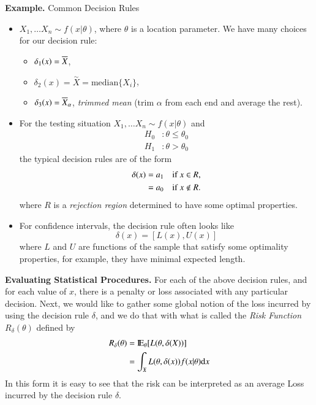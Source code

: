 \documentclass[captions=tableheading]{scrbook}
\begin{document}
\textbf{Example.} Common Decision Rules

\begin{itemize}
\item $X_{1},\ldots X_{n}\sim f(x|\theta)$, where $\theta$ is a location parameter. We have many choices for our decision rule:
\begin{itemize}
\item $\delta_{1}(x)=\overline{X}$,
\item $\delta_{2}(x)=\overset{\sim}{X}=\mathrm{median}\{X_{i}\}$,
\item $\delta_{3}(x)=\overline{X}_{\alpha}$, \emph{trimmed mean} (trim $\alpha$ from each end and average the rest).
\end{itemize}
\item For the testing situation \(X_{1},\ldots X_{n}\sim f(x|\theta)\) and
   \begin{align*}
   H_{0} & :\theta \leq \theta_{0}\\
   H_{1} & :\theta > \theta_{0}
   \end{align*}
   the typical decision rules are of the form 
   \begin{align*}
   \delta(x) & =a_{1}\quad\mbox{if \ensuremath{x\in R},}\\
   & =a_{0}\quad\mbox{if \ensuremath{x\notin R}.}
   \end{align*}
   where $R$ is a \emph{rejection region} determined to have some optimal properties.
\item For confidence intervals, the decision rule often looks like 
   \[
   \delta(x)=[L(x),U(x)]
   \]
   where $L$ and $U$ are functions of the sample that satisfy some optimality properties, for example, they have minimal expected length.
\end{itemize}
\textbf{Evaluating Statistical Procedures.} For each of the above decision rules, and for each value of $x$, there is a penalty or loss associated with any particular decision. Next, we would like to gather some global notion of the loss incurred by using the decision rule $\delta$, and we do that with what is called the \emph{Risk Function} $R_{\delta}(\theta)$ defined by 
\begin{align*}
R_{\delta}(\theta) & =\mathrm{I\hspace{-1.5pt}E}_{\theta}[L(\theta,\delta(X))]\\
 & =\int_{\mathfrak{X}}L(\theta,\delta(x))f(x|\theta)\mathrm{d} x
\end{align*}
In this form it is easy to see that the risk can be interpreted as an average Loss incurred by the decision rule $\delta$.
\end{document}
